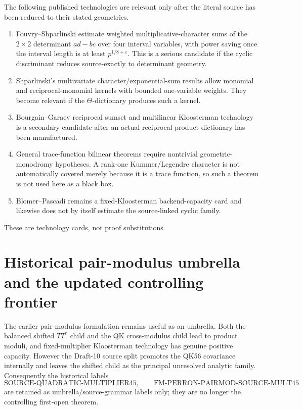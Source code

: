 \documentclass[11pt]{article}
\theoremstyle{definition}
\theoremstyle{remark}
\newcommand{\1}{\mathbf 1}
\begin{document}
The following published technologies are relevant only after the literal source has been reduced to their stated
geometries.
\begin{enumerate}
\item Fouvry--Shparlinski estimate weighted multiplicative-character sums of the $2\times2$ determinant
$ad-bc$ over four interval variables, with power saving once the interval length is at least $p^{1/8+\varepsilon}$.
This is a serious candidate if the cyclic discriminant reduces source-exactly to determinant geometry.
\item Shparlinski's multivariate character/exponential-sum results allow monomial and reciprocal-monomial
kernels with bounded one-variable weights.  They become relevant if the $\Theta$-dictionary produces such a
kernel.
\item Bourgain--Garaev reciprocal sumset and multilinear Kloosterman technology is a secondary candidate after
an actual reciprocal-product dictionary has been manufactured.
\item General trace-function bilinear theorems require nontrivial geometric-monodromy hypotheses.  A rank-one
Kummer/Legendre character is not automatically covered merely because it is a trace function, so such a theorem
is not used here as a black box.
\item Blomer--Pascadi remains a fixed-Kloosterman backend-capacity card and likewise does not by itself estimate
the source-linked cyclic family.
\end{enumerate}
These are technology cards, not proof substitutions.

\section{Historical pair-modulus umbrella and the updated controlling frontier}
\label{sec:g1b-pairmod}

The earlier pair-modulus formulation remains useful as an umbrella.  Both the balanced shifted $TT^*$ child and
the QK cross-modulus child lead to product moduli, and fixed-multiplier Kloosterman technology has genuine
positive capacity.  However the Draft-10 source split promotes the QK56 covariance internally and leaves the
shifted child as the principal unresolved analytic family.  Consequently the historical labels
\[
 \mathrm{SOURCE\!\mbox{-}QUADRATIC\!\mbox{-}MULTIPLIER45},\qquad
 \mathrm{FM\!\mbox{-}PERRON\!\mbox{-}PAIRMOD\!\mbox{-}SOURCE\!\mbox{-}MULT45}
\]
are retained as umbrella/source-grammar labels only; they are no longer the controlling first-open theorem.
\end{document}
